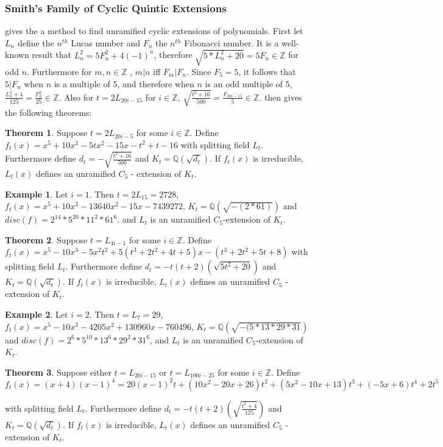 \documentclass[12pt]{extarticle}
\newcommand{\Q}{\mathbb{Q}}
\newcommand{\Z}{\mathbb{Z}}
\newcommand{\<}{\langle}
\renewcommand{\>}{\rangle}
\theoremstyle{definition}
\newtheorem{theorem}{Theorem}
\newtheorem*{example}{Example}
\begin{document}
\subsubsection{Smith's Family of Cyclic Quintic Extensions}
\cite{SMITH} gives the a method to find unramified cyclic extensions of polynomials. First let $L_n$ define the $n^{th}$ Lucas number and $F_n$ the $n^{th}$ Fibonacci number. It is a well-known result that $L_n^2 = 5F_n^2+4(-1)^n$, therefore $\sqrt{5*L_n^2+20} = 5F_n \in \mathbb{Z}$ for odd $n$. Furthermore for $m,n \in \Z$ , $m|n$ iff $F_m | F_n$. Since $F_5 = 5$, it follows that $5| F_n $ when $n$ is a multiple of 5, and therefore when $n$ is an odd multiple of 5, $\frac{L_n^2+4}{125} = \frac{F_n^2}{25} \in \Z$. Also for $t = 2L_{20i-15}$ for $i \in \Z$, $\sqrt{\frac{t^2+16}{500}} = \frac{F_{20i-15}}{5} \in \Z$. 
\cite{SMITH} then gives the following theorems:
\begin{theorem}
Suppose $t = 2L_{20i-5}$ for some $i \in \Z$. Define $f_t(x) = x^5 + 10x^3 - 5tx^2-15x-t^2+t-16$ with splitting field $L_t$. Furthermore define $d_t = -\sqrt{\frac{t^2+16}{500}}$ and $K_t = \Q(\sqrt{d_t})$. If $f_t(x)$ is irreducible, $L_t(x)$ defines an unramified $C_5$ - extension of $K_t$. 
\end{theorem}
\begin{example}
Let $i=1$. Then $t=2L_{15} = 2728$, $f_t(x) = x^5 + 10x^3 - 13640x^2 - 15x - 7439272$, $K_t = \Q(\sqrt{-(2*61)})$ and $disc(f) = 2^{14} * 5^{20} * 11^2 * 61^6$. and $L_t$ is an unramified $C_5$-extension of $K_t$. 
\end{example}
\begin{theorem}
Suppose $t = L_{4i-1}$ for some $i \in \Z$. Define $f_t(x) = x^5 -10x^3 - 5x^2t^2+5(t^3+2t^2+4t+5)x-(t^3+2t^2+5t+8)$ with splitting field $L_t$. Furthermore define $d_t = -t(t+2)(\sqrt{5t^2+20})$ and $K_t = \Q(\sqrt{d_t})$. If $f_t(x)$ is irreducible, $L_t(x)$ defines an unramified $C_5$ - extension of $K_t$.
\end{theorem}
\begin{example}
Let $i=2$. Then $t=L_{7} = 29$, $f_t(x) = x^5 - 10x^3 - 4205x^2 + 130960x - 760496$, $K_t = \Q(\sqrt{-( 5 * 13 * 29 * 31})$ and $disc(f) =2^6 * 5^{10} * 13^6 * 29^2 * 31^6$,  and $L_t$ is an unramified $C_5$-extension of $K_t$. 
\end{example}
\begin{theorem}
Suppose either $t = L_{20i-15}$ or $t = L_{100i-25}$ for some $i \in \Z$. Define $f_t(x) = (x+4)(x-1)^4 = 20(x-1)^2t + (10x^2-20x+26)t^2 + (5x^2-10x+13)t^3 +(-5x+6)t^4 + 2t^5$

 with splitting field $L_t$. Furthermore define $d_t = -t(t+2)\left(\sqrt{\frac{t^2+4}{125}}\right)$ and $K_t = \Q(\sqrt{d_t})$. If $f_t(x)$ is irreducible, $L_t(x)$ defines an unramified $C_5$ - extension of $K_t$. 
\end{theorem}
\end{document}
